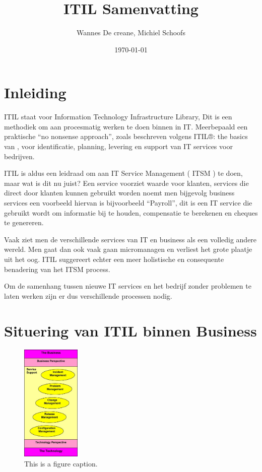 \documentclass{article}
\date{\today}
\title{ITIL Samenvatting}
\author{Wannes De creane, Michiel Schoofs}
\begin{document}
	\maketitle
	\section{Inleiding}
	ITIL staat voor Information Technology Infrastructure Library, Dit is een methodiek om aan procesmatig werken te doen binnen in IT. Meerbepaald een praktische “no nonsense approach”, zoals beschreven volgens ITIL®: the basics van \cite{Cater-Steel2006}, voor identificatie, planning, levering en support van IT services voor bedrijven.\\
	
	\par
	\noindent
	ITIL is aldus een leidraad om aan IT Service Management ( ITSM ) te doen, maar wat is dit nu juist? Een service voorziet waarde voor klanten, services die direct door klanten kunnen gebruikt worden noemt men bijgevolg business services een voorbeeld hiervan is bijvoorbeeld “Payroll”, dit is een IT service die gebruikt wordt om informatie bij te houden, compensatie te berekenen en cheques te genereren.\\
	
	\par
	\noindent
	Vaak ziet men de verschillende services van IT en business als een volledig andere wereld. Men gaat dan ook vaak gaan micromanagen en verliest het grote plaatje uit het oog. ITIL suggereert echter een meer holistische en consequente benadering van het ITSM process.\\
	
	\par
	\noindent
	Om de samenhang tussen nieuwe IT services en het bedrijf zonder problemen te laten werken zijn er dus verschillende processen nodig.
	
	\section{Situering van ITIL binnen Business}
	
	\begin{figure}
		\centering
		\includegraphics[width=0.25\textwidth]{itil1.jpg}
		\caption{\label{fig1:ItilProcess}This is a figure caption.}
	\end{figure}
	
\end{document}
